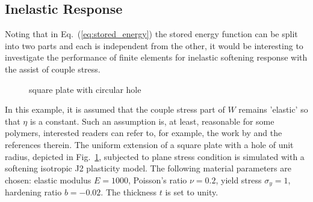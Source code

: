 \documentclass[3p,sort&compress,11pt,fleqn]{elsarticle}
\newcommand*{\figref}[1]{Fig.~\ref{#1}}
\newcommand*{\eqsref}[1]{Eq.~(\ref{#1})}
\begin{document}
\subsection{Inelastic Response}
Noting that in \eqsref{eq:stored_energy} the stored energy function can be split into two parts and each is independent from the other, it would be interesting to investigate the performance of finite elements for inelastic softening response with the assist of couple stress.

\begin{figure}[htb]
\centering\footnotesize
{}
\caption{square plate with circular hole}\label{fig:plate_with_hole}
\end{figure}
In this example, it is assumed that the couple stress part of $W$ remains 'elastic' so that $\eta$ is a constant. Such an assumption is, at least, reasonable for some polymers, interested readers can refer to, for example, the work by \citet{Alisafaei2016} and the references therein. The uniform extension of a square plate with a hole of unit radius, depicted in \figref{fig:plate_with_hole}, subjected to plane stress condition is simulated with a softening isotropic J2 plasticity model. The following material parameters are chosen: elastic modulus $E=\num{1000}$, Poisson's ratio $\nu=\num{0.2}$, yield stress $\sigma_y=\num{1}$, hardening ratio $b=\num{-0.02}$. The thickness $t$ is set to unity.
%
%
%
\end{document}

